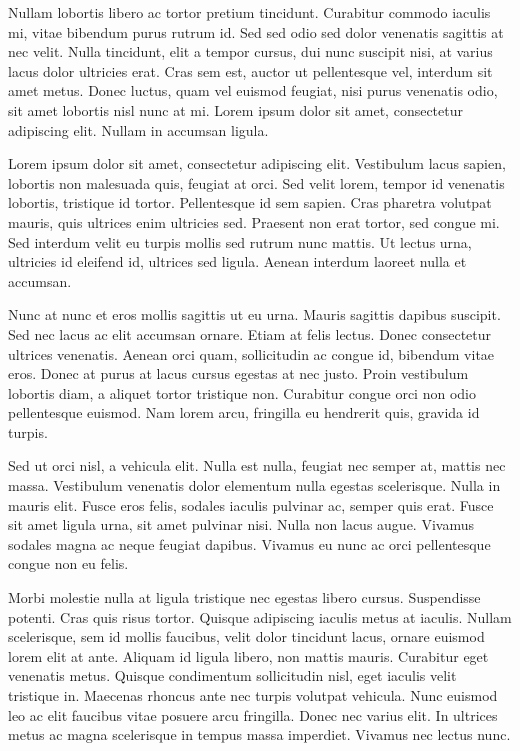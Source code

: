 \documentclass{article}
\begin{document}
Nullam lobortis libero ac tortor pretium tincidunt. Curabitur commodo iaculis
mi, vitae bibendum purus rutrum id. Sed sed odio sed dolor venenatis sagittis at
nec velit. Nulla tincidunt, elit a tempor cursus, dui nunc suscipit nisi, at
varius lacus dolor ultricies erat. Cras sem est, auctor ut pellentesque vel,
interdum sit amet metus. Donec luctus, quam vel euismod feugiat, nisi purus
venenatis odio, sit amet lobortis nisl nunc at mi. Lorem ipsum dolor sit amet,
consectetur adipiscing elit. Nullam in accumsan ligula.

Lorem ipsum dolor sit amet, consectetur adipiscing elit. Vestibulum lacus
sapien, lobortis non malesuada quis, feugiat at orci. Sed velit lorem, tempor id
venenatis lobortis, tristique id tortor. Pellentesque id sem sapien. Cras
pharetra volutpat mauris, quis ultrices enim ultricies sed. Praesent non erat
tortor, sed congue mi. Sed interdum velit eu turpis mollis sed rutrum nunc
mattis. Ut lectus urna, ultricies id eleifend id, ultrices sed ligula. Aenean
interdum laoreet nulla et accumsan.

Nunc at nunc et eros mollis sagittis ut eu urna. Mauris sagittis dapibus
suscipit. Sed nec lacus ac elit accumsan ornare. Etiam at felis lectus. Donec
consectetur ultrices venenatis. Aenean orci quam, sollicitudin ac congue id,
bibendum vitae eros. Donec at purus at lacus cursus egestas at nec justo. Proin
vestibulum lobortis diam, a aliquet tortor tristique non. Curabitur congue orci
non odio pellentesque euismod. Nam lorem arcu, fringilla eu hendrerit quis,
gravida id turpis.

Sed ut orci nisl, a vehicula elit. Nulla est nulla, feugiat nec semper at,
mattis nec massa. Vestibulum venenatis dolor elementum nulla egestas
scelerisque. Nulla in mauris elit. Fusce eros felis, sodales iaculis pulvinar
ac, semper quis erat. Fusce sit amet ligula urna, sit amet pulvinar nisi. Nulla
non lacus augue. Vivamus sodales magna ac neque feugiat dapibus. Vivamus eu nunc
ac orci pellentesque congue non eu felis.

Morbi molestie nulla at ligula tristique nec egestas libero cursus. Suspendisse
potenti. Cras quis risus tortor. Quisque adipiscing iaculis metus at iaculis.
Nullam scelerisque, sem id mollis faucibus, velit dolor tincidunt lacus, ornare
euismod lorem elit at ante. Aliquam id ligula libero, non mattis mauris.
Curabitur eget venenatis metus. Quisque condimentum sollicitudin nisl, eget
iaculis velit tristique in. Maecenas rhoncus ante nec turpis volutpat vehicula.
Nunc euismod leo ac elit faucibus vitae posuere arcu fringilla. Donec nec varius
elit. In ultrices metus ac magna scelerisque in tempus massa imperdiet. Vivamus
nec lectus nunc.
\end{document}
